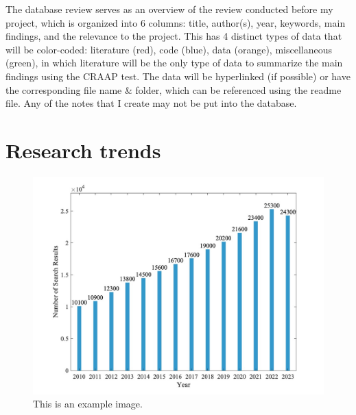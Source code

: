 The database review serves as an overview of the review conducted before my project, which is organized into 6 columns: title, author(s), year, keywords, main findings, and the relevance to the project. This has 4 distinct types of data that will be color-coded: literature (red), code (blue), data (orange), miscellaneous (green), in which literature will be the only type of data to summarize the main findings using the CRAAP test. The data will be hyperlinked (if possible) or have the corresponding file name \& folder, which can be referenced using the readme file. Any of the notes that I create may not be put into the database.  
\section{Research trends}
    \begin{figure}[H]
        \centering
        \includegraphics[width=1\textwidth]{00_Images/00_Literature_Review/00_PEMFC_July_12_2024_v1.jpg}  %
        \caption{This is an example image.}
        \label{fig:example1}
    \end{figure}

